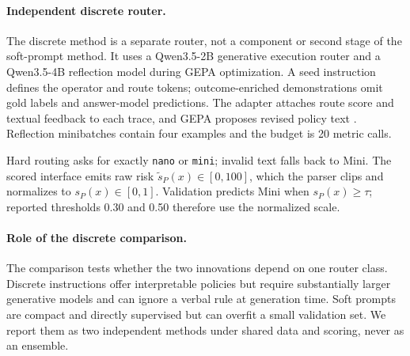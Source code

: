 \paragraph{Independent discrete router.}
The discrete method is a separate router, not a component or second stage of
the soft-prompt method. It uses a Qwen3.5-2B generative execution router and a
Qwen3.5-4B reflection model during GEPA optimization. A seed instruction
defines the operator and route tokens; outcome-enriched demonstrations omit
gold labels and answer-model predictions. The adapter attaches route score and
textual feedback to each trace, and GEPA proposes revised policy text
\cite{agrawal2025gepa}. Reflection minibatches contain four examples and the
budget is 20 metric calls.

Hard routing asks for exactly \texttt{nano} or \texttt{mini}; invalid text
falls back to Mini. The scored interface emits raw risk
$\tilde{s}_P(x)\in[0,100]$, which the parser clips and normalizes to
$s_P(x)\in[0,1]$. Validation predicts Mini when $s_P(x)\ge\tau$; reported
thresholds 0.30 and 0.50 therefore use the normalized scale.

\paragraph{Role of the discrete comparison.}
The comparison tests whether the two innovations depend on one router class.
Discrete instructions offer interpretable policies but require substantially
larger generative models and can ignore a verbal rule at generation time. Soft
prompts are compact and directly supervised but can overfit a small validation
set. We report them as two independent methods under shared data and scoring,
never as an ensemble.


